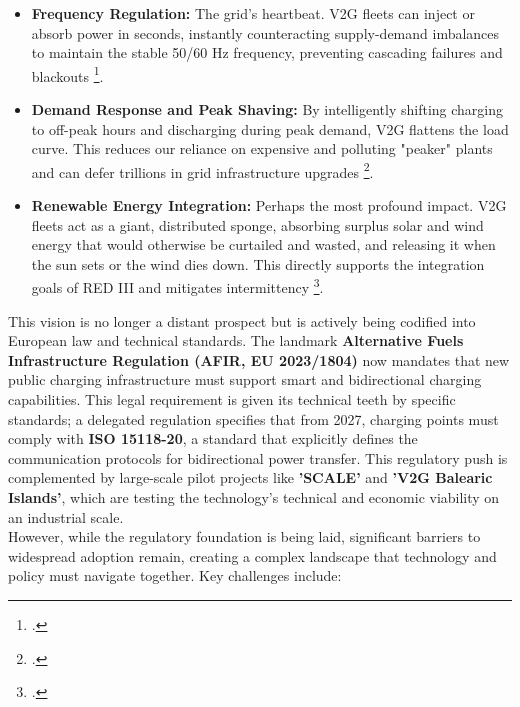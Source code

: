 \begin{itemize}
    \item \textbf{Frequency Regulation:} The grid's heartbeat. V2G fleets can inject or absorb power in seconds, instantly counteracting supply-demand imbalances to maintain the stable 50/60 Hz frequency, preventing cascading failures and blackouts \footcite{alfaverh2022optima, sadeghi2021deep}.
    
    \item \textbf{Demand Response and Peak Shaving:} By intelligently shifting charging to off-peak hours and discharging during peak demand, V2G flattens the load curve. This reduces our reliance on expensive and polluting "peaker" plants and can defer trillions in grid infrastructure upgrades \footcite{orfanoudakis2022deep}.
    
    \item \textbf{Renewable Energy Integration:} Perhaps the most profound impact. V2G fleets act as a giant, distributed sponge, absorbing surplus solar and wind energy that would otherwise be curtailed and wasted, and releasing it when the sun sets or the wind dies down. This directly supports the integration goals of RED III and mitigates intermittency \footcite{khan2024review, zou2021deep}.
\end{itemize}
This vision is no longer a distant prospect but is actively being codified into European law and technical standards. The landmark \textbf{Alternative Fuels Infrastructure Regulation (AFIR, EU 2023/1804)} now mandates that new public charging infrastructure must support smart and bidirectional charging capabilities. This legal requirement is given its technical teeth by specific standards; a delegated regulation specifies that from 2027, charging points must comply with \textbf{ISO 15118-20}, a standard that explicitly defines the communication protocols for bidirectional power transfer. This regulatory push is complemented by large-scale pilot projects like \textbf{'SCALE'} and \textbf{'V2G Balearic Islands'}, which are testing the technology's technical and economic viability on an industrial scale.
\\
\noindent
However, while the regulatory foundation is being laid, significant barriers to widespread adoption remain, creating a complex landscape that technology and policy must navigate together. Key challenges include:
